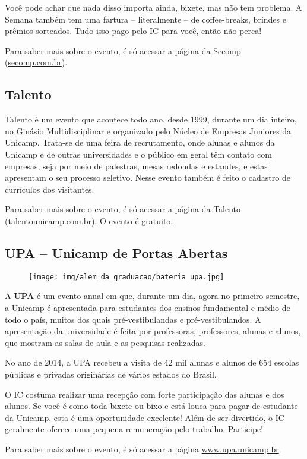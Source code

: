 Você pode achar que nada disso importa ainda, bixete, mas não tem problema. A
Semana também tem uma fartura -- literalmente -- de coffee-breaks, brindes e
prêmios sorteados. Tudo isso pago pelo IC para você, então não perca!

Para saber mais sobre o evento, é só acessar a página da Secomp
(\url{secomp.com.br}).

\subsection{Talento}

Talento é um evento que acontece todo ano, des\-de 1999, durante um dia
inteiro, no Ginásio Multidisciplinar e organizado pelo Núcleo de Empresas
Juniores da Unicamp. Trata-se de uma feira de recrutamento, onde alunas e
alunos da Unicamp e de outras universidades e o público em geral têm contato
com empresas, seja por meio de palestras, mesas redondas e estandes, e estas
apresentam o seu processo seletivo. Nesse evento também é feito o cadastro de
currículos dos visitantes.

Para saber mais sobre o evento, é só acessar a página da Talento
(\url{talentounicamp.com.br}). O evento é gratuito.

\subsection{UPA -- Unicamp de Portas Abertas}

\begin{figure}[h!]
  \centering
  \texttt{[image: img/alem\_da\_graduacao/bateria\_upa.jpg]}
\end{figure}

A \textbf{UPA} é um evento anual em que, durante um dia, agora no primeiro
semestre, a Unicamp é apresentada para estudantes dos ensinos fundamental e
médio de todo o país, muitos dos quais pré-vestibulandas e pré-vestibulandos. A
apresentação da universidade é feita por professoras, professores, alunas e
alunos, que mostram as salas de aula e as pesquisas realizadas.

No ano de 2014, a UPA recebeu a visita de 42 mil alunas e alunos de 654 escolas
públicas e privadas originárias de vários estados do Brasil.

O IC costuma realizar uma recepção com forte participação das alunas e dos
alunos. Se você é como toda bixete ou bixo e está louca para pagar de estudante
da Unicamp, esta é uma oportunidade excelente! Além de ser divertido, o IC
geralmente oferece uma pequena remuneração pelo trabalho. Participe!

Para saber mais sobre o evento, é só acessar a página \url{www.upa.unicamp.br}.
